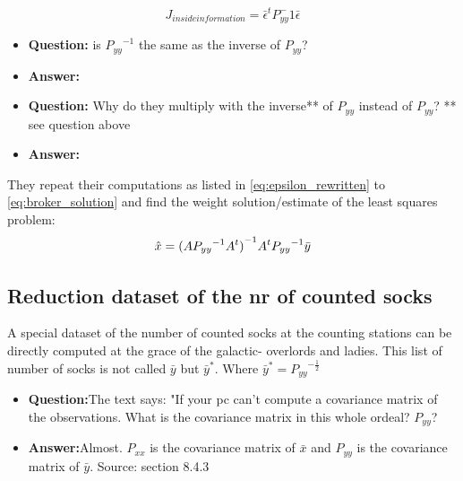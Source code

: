 \begin{equation}
    J_{inside information}=\bar{\epsilon}^tP_{yy}^-1\bar{\epsilon}
\end{equation}

\begin{itemize}
    \item \textbf{Question:} is ${P_{yy}}^{-1}$ the same as the inverse of $P_{yy}$?
    \item \textbf{Answer:}
\end{itemize}

\begin{itemize}
    \item \textbf{Question:} Why do they multiply with the inverse** of $P_{yy}$ instead of $P_{yy}$?
    ** see question above
    \item \textbf{Answer:}
\end{itemize}

They repeat their computations as listed in \cref{eq:epsilon_rewritten} to \cref{eq:broker_solution} and find the weight solution/estimate of the least squares problem:
\begin{equation}
    \hat{x}={(A{P_{yy}}^{-1}A^t)}^{-1}{A^t{P_{yy}}^{-1}\Bar{y}}
    \label{eq:insider_broker_solution}
\end{equation}

\subsection{Reduction dataset of the nr of counted socks}
A special dataset of the number of counted socks at the counting stations can be directly computed at the grace of the galactic- overlords and ladies. This list of number of socks is not called $\bar{y}$ but $\bar{y}^*$. Where $\bar{y}^*={P_{yy}}^{-\frac{1}{2}}$

\begin{itemize}
    \item \textbf{Question:}The text says: "If your pc can't compute a covariance matrix of the observations. What is the covariance matrix in this whole ordeal? $P_{yy}$?
    \item \textbf{Answer:}Almost. $P_{xx}$ is the covariance matrix of $\bar{x}$ and $P_{yy}$ is the covariance matrix of $\bar{y}$. Source: section 8.4.3
\end{itemize}

\newpage
